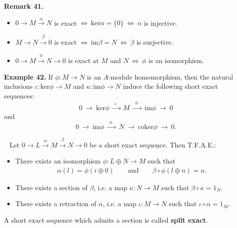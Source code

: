 \documentclass[12pt,a4paper,footinclude=true,headinclude=true]{scrbook} %
\newenvironment{proposition}[2][]
{\renewcommand\theinnercustomprop{#2}\innercustomprop[#1] 
\begin{mdframed}[backgroundcolor=gray!20]\ }
{\end{mdframed}\endinnercustomprop}
\newenvironment{remark}[2][Remark]
    { \begin{mdframed}[backgroundcolor=gray!20] \textbf{#1 #2.} }
    {  \end{mdframed}}
\newenvironment{example}[2][Example]
    { \begin{mdframed}[backgroundcolor=gray!20] \textbf{#1 #2.} }
    {  \end{mdframed}}
\begin{document}
\begin{remark}{41}
    \begin{itemize}
        \item[(a)] $0\xrightarrow{~~~} M\xrightarrow{~\alpha~} N$ is exact  $\Longleftrightarrow\ \mathrm{ker}\alpha=\{0\}\ \Longleftrightarrow\ \alpha$ is injective.
        \item[(b)] $M\xrightarrow{~~~} N\xrightarrow{~\beta~} 0$ is exact  $\Longleftrightarrow\ \mathrm{im}\beta=N\ \Longleftrightarrow\ \beta$ is surjective.
        \item[(c)] $0\xrightarrow{~~~} M\xrightarrow{~\phi~} N\xrightarrow{~~~} 0$ is exact at $M$ and $N\ \Longleftrightarrow\ \phi$ is an isomorphism.
    \end{itemize}
\end{remark}
\newpage
\begin{example}{42}
    If $\phi:M\to N$ is an $A$-module homomorphism, then the natural inclusions $\iota:\mathrm{ker}\phi\to M$ and $\kappa:\mathrm{im}\phi\to N$ induce the following short exact sequences:
    \begin{equation*}
        0\ \xrightarrow{~~~~~~}\ \mathrm{ker}\phi\ \xrightarrow{~~\iota~~~}\ M\ \xrightarrow{~~\phi~~~}\ \mathrm{im}\phi\ \xrightarrow{~~~~~~}\ 0
    \end{equation*}
    and
    \begin{equation*}
        0\ \xrightarrow{~~~~~~}\ \mathrm{im}\phi\ \xrightarrow{~~\kappa~~~}\ N\ \xrightarrow{~~~~~~}\ \mathrm{coker}\phi\ \xrightarrow{~~~~~~}\ 0.
    \end{equation*}
\end{example}

\begin{proposition}{43. (Split Exact)}
    Let $0\to L\xrightarrow{\alpha} M\xrightarrow{\beta} N\to0$ be a short exact sequence. Then T.F.A.E.:
    \begin{itemize}
        \item[(a)] There exists an isomorphism $\phi:L\oplus N\to M$ such that
        \begin{align*}
            \alpha(l)=\phi(i\oplus0)\qquad\text{and}\qquad \beta\circ\phi(l\oplus n)=n.
        \end{align*}
        \item[(b)] There exists a section of $\beta$, i.e. a map $\kappa:N\to M$ such that $\beta\circ\kappa=1_N$.
        \item[(c)] There exists a retraction of $\alpha$, i.e. a map $\iota:M\to N$ such that $\iota\circ\alpha=1_M$.
    \end{itemize}
    A short exact sequence which admits a section is called \textbf{split exact}.
\end{proposition}
\end{document}
